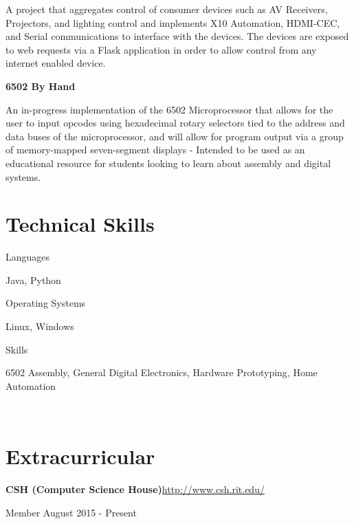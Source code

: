 \documentclass[letter,margin,line]{resume}
\newcommand{\rurl}[1]{\hfill {\footnotesize \url{#1}}}
\begin{document}
\begin{resume}
\begin{asparablank}
		\small A project that aggregates control of consumer devices such as AV Receivers, Projectors, and lighting control and implements X10 Automation, HDMI-CEC, and Serial communications to interface with the devices. The devices are exposed to web requests via a Flask application in order to allow control from any internet enabled device.
		\normalsize
		\\	
        \item {\bf 6502 By Hand}\rurl{}
        
        \small An in-progress implementation of the 6502 Microprocessor that allows for the user to input opcodes using hexadecimal rotary selectors tied to the address and data buses of the microprocessor, and will allow for program output via a group of memory-mapped seven-segment displays - Intended to be used as an educational resource for students looking to learn about assembly and digital systems.
        \normalsize
        \\
	\end{asparablank}
    
\section{\mysidestyle Technical Skills}
	\begin{compactdesc}
		\item[Languages] \begin{inparaenum} { \small
			Java, Python
		} \end{inparaenum}
		\item[Operating Systems] \begin{inparaenum} { \small
			Linux, Windows
		} \end{inparaenum}
        \item[Skills] \begin{inparaenum} { \small
			6502 Assembly, General Digital Electronics, Hardware Prototyping, Home Automation
        } \end{inparaenum}
        \normalsize
        \\
	\end{compactdesc}

    
\section{\mysidestyle Extracurricular}
	\begin{asparablank}
		\item {\bf CSH ({\small Computer Science House})}\rurl{http://www.csh.rit.edu/}
		\small	\item Member \hfill August 2015 - Present
        \linebreak
        

\end{asparablank}
\end{resume}
\end{document}
